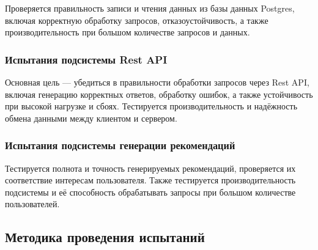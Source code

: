 Проверяется правильность записи и чтения данных из базы данных Postgres, включая корректную обработку запросов, отказоустойчивость, а также производительность при большом количестве запросов и данных.

\subsubsection{Испытания подсистемы Rest API}

Основная цель — убедиться в правильности обработки запросов через Rest API, включая генерацию корректных ответов, обработку ошибок, а также устойчивость при высокой нагрузке и сбоях. Тестируется производительность и надёжность обмена данными между клиентом и сервером.

\subsubsection{Испытания подсистемы генерации рекомендаций}

Тестируется полнота и точность генерируемых рекомендаций, проверяется их соответствие интересам пользователя. Также тестируется производительность подсистемы и её способность обрабатывать запросы при большом количестве пользователей.

\subsection{Методика проведения испытаний}

